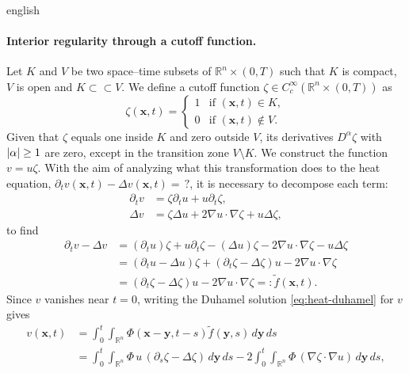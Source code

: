 \documentclass[../0000.tex]{subfiles}
\begin{document}
\begin{hyphenrules}{english}
\paragraph{Interior regularity through a cutoff function.}
Let $K$ and $V$ be two
space--time subsets of $\mathbb{R}^n\times(0,T)$ such that $K$ is compact, $V$ is open and $K\subset\subset V$.
We define a cutoff function $\zeta\in C_c^\infty(\mathbb{R}^n\times(0,T))$ as
\begin{equation}
  \zeta(\mathbf{x},t)=
  \begin{cases}
    1 & \text{if } (\mathbf{x},t)\in K,\\
    0 & \text{if } (\mathbf{x},t)\notin V.
  \end{cases}
  \label{eq:cutoff}
\end{equation}
Given that $\zeta$ equals one inside $K$ and zero outside $V$, its derivatives $D^\alpha\zeta$ with
$\left\lvert \alpha \right\rvert\ge1$ are zero, except in the transition zone $V\setminus K$. We construct the function
$v=u\zeta$. With the aim of analyzing what this transformation does to the heat equation,
$\partial_t v(\mathbf{x},t)-\Delta v(\mathbf{x},t)=\,?$, it is necessary to decompose each term:
\begin{align}
  \partial_t v&=\zeta\partial_t u+u\partial_t\zeta, \label{eq:cut-dt}\\
  \Delta v&=\zeta\Delta u+2\nabla u\cdot\nabla\zeta+u\Delta\zeta, \label{eq:cut-lap}
\end{align}
to find
\begin{align}
  \partial_t v-\Delta v
    &=(\partial_t u)\zeta+u\partial_t\zeta-(\Delta u)\zeta-2\nabla u\cdot\nabla\zeta-u\Delta\zeta \label{eq:cut-1}\\
    &=(\partial_t u-\Delta u)\zeta+(\partial_t\zeta-\Delta\zeta)u-2\nabla u\cdot\nabla\zeta \label{eq:cut-2}\\
    &=(\partial_t\zeta-\Delta\zeta)u-2\nabla u\cdot\nabla\zeta=:\tilde f(\mathbf{x},t). \label{eq:cut-3}
\end{align}
Since $v$ vanishes near $t=0$, writing the Duhamel solution \eqref{eq:heat-duhamel} for $v$ gives
\begin{align}
  v(\mathbf{x},t)&=\int_0^t\!\!\int_{\mathbb{R}^n}\Phi(\mathbf{x}-\mathbf{y},t-s)\tilde f(\mathbf{y},s)\,d\mathbf{y}\,d s \label{eq:cut-4}\\
         &=\int_0^t\!\!\int_{\mathbb{R}^n}\Phi\,u\,(\partial_s\zeta-\Delta\zeta)\,d\mathbf{y}\,d s
           -2\int_0^t\!\!\int_{\mathbb{R}^n}\Phi\,(\nabla\zeta\cdot\nabla u)\,d\mathbf{y}\,d s, \label{eq:cut-5}

\end{align}
\end{hyphenrules}
\end{document}
